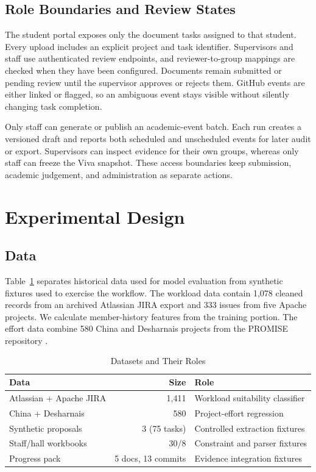 \documentclass[conference]{IEEEtran}
\begin{document}
\subsection{Role Boundaries and Review States}
The student portal exposes only the document tasks assigned to that student. Every upload includes an explicit project and task identifier. Supervisors and staff use authenticated review endpoints, and reviewer-to-group mappings are checked when they have been configured. Documents remain submitted or pending review until the supervisor approves or rejects them. GitHub events are either linked or flagged, so an ambiguous event stays visible without silently changing task completion.

Only staff can generate or publish an academic-event batch. Each run creates a versioned draft and reports both scheduled and unscheduled events for later audit or export. Supervisors can inspect evidence for their own groups, whereas only staff can freeze the Viva snapshot. These access boundaries keep submission, academic judgement, and administration as separate actions.

\section{Experimental Design}

\subsection{Data}
Table~\ref{tab:data} separates historical data used for model evaluation from synthetic fixtures used to exercise the workflow. The workload data contain 1,078 cleaned records from an archived Atlassian JIRA export and 333 issues from five Apache projects. We calculate member-history features from the training portion. The effort data combine 580 China and Desharnais projects from the PROMISE repository \cite{promise2005}.

\begin{table}[t]
\caption{Datasets and Their Roles}
\label{tab:data}
\centering
\footnotesize
\begin{tabular}{|p{2.25cm}|r|p{3.8cm}|}
\hline
Data & Size & Role \\ \hline
Atlassian + Apache JIRA & 1,411 & Workload suitability classifier \\ \hline
China + Desharnais & 580 & Project-effort regression \\ \hline
Synthetic proposals & 3 (75 tasks) & Controlled extraction fixtures \\ \hline
Staff/hall workbooks & 30/8 & Constraint and parser fixtures \\ \hline
Progress pack & 5 docs, 13 commits & Evidence integration fixtures \\ \hline
\end{tabular}
\end{table}
\end{document}
